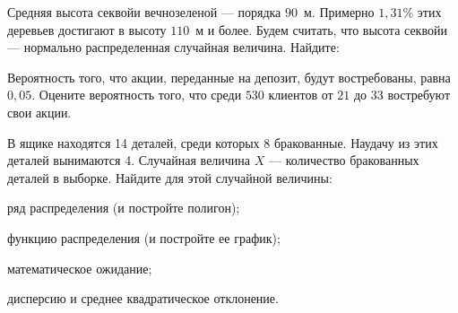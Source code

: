 \vfil

\begin{zkrPlain}{25}\noindent 
	Средняя высота секвойи вечнозеленой  — порядка {$90$~м}. Примерно $1{,}31\%$ этих деревьев достигают в высоту $110$~м и более. Будем считать, что высота секвойи — нормально распределенная случайная величина. Найдите: \par {}
 
\end{zkrPlain}

\vfil

\begin{zkrPlain}{25}\noindent 
	Вероятность того, что акции, переданные на депозит, будут востребованы, равна $ 0{,}05 $. Оцените вероятность того, что среди $ 530 $ клиентов от $ 21 $ до $ 33 $ востребуют свои акции.
 
\end{zkrPlain}

\newpage\setcounter{zad}{0}\setcounter{footnote}{0}



\begin{zkrPlain}{25}\noindent 
	В ящике находятся 14 деталей, среди которых 8 бракованные. Наудачу из этих деталей вынимаются 4. Случайная величина $X$ --- количество бракованных деталей в выборке.  Найдите для этой случайной величины: \par \smallskip\small{ \par \zz ряд распределения (и постройте полигон); \par \zz функцию распределения (и постройте ее график); \par \zz математическое ожидание; \par \zz дисперсию и среднее квадратическое отклонение.\par \par}
 
\end{zkrPlain}

\vfil


